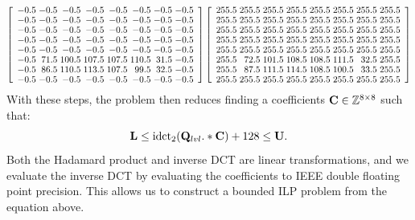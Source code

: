 {\small
\begin{equation}
\left[
\begin{array}{r@{\hspace{3pt}}r@{\hspace{3pt}}r@{\hspace{3pt}}r@{\hspace{3pt}}r@{\hspace{3pt}}r@{\hspace{3pt}}r@{\hspace{3pt}}r}
-0.5 & -0.5 & -0.5 & -0.5 & -0.5 & -0.5 & -0.5 & -0.5\\[-1pt]
-0.5 & -0.5 & -0.5 & -0.5 & -0.5 & -0.5 & -0.5 & -0.5\\[-1pt]
-0.5 & -0.5 & -0.5 & -0.5 & -0.5 & -0.5 & -0.5 & -0.5\\[-1pt]
-0.5 & -0.5 & -0.5 & -0.5 & -0.5 & -0.5 & -0.5 & -0.5\\[-1pt]
-0.5 & -0.5 & -0.5 & -0.5 & -0.5 & -0.5 & -0.5 & -0.5\\[-1pt]
-0.5 & 71.5 & 100.5 & 107.5 & 107.5 & 110.5 & 31.5 & -0.5\\[-1pt]
-0.5 & 86.5 & 110.5 & 113.5 & 107.5 &  99.5 & 32.5 & -0.5\\[-1pt]
-0.5 & -0.5 & -0.5 & -0.5 & -0.5 & -0.5 & -0.5 & -0.5\\[-1pt]
\end{array}
\right]
\left[
\begin{array}{r@{\hspace{3pt}}r@{\hspace{3pt}}r@{\hspace{3pt}}r@{\hspace{3pt}}r@{\hspace{3pt}}r@{\hspace{3pt}}r@{\hspace{3pt}}r}
255.5 & 255.5 & 255.5 & 255.5 & 255.5 & 255.5 & 255.5 & 255.5\\[-1pt]
255.5 & 255.5 & 255.5 & 255.5 & 255.5 & 255.5 & 255.5 & 255.5\\[-1pt]
255.5 & 255.5 & 255.5 & 255.5 & 255.5 & 255.5 & 255.5 & 255.5\\[-1pt]
255.5 & 255.5 & 255.5 & 255.5 & 255.5 & 255.5 & 255.5 & 255.5\\[-1pt]
255.5 & 255.5 & 255.5 & 255.5 & 255.5 & 255.5 & 255.5 & 255.5\\[-1pt]
255.5 & 72.5 & 101.5 & 108.5 & 108.5 & 111.5 & 32.5 & 255.5\\[-1pt]
255.5 & 87.5 & 111.5 & 114.5 & 108.5 & 100.5 & 33.5 & 255.5\\[-1pt]
255.5 & 255.5 & 255.5 & 255.5 & 255.5 & 255.5 & 255.5 & 255.5\\[-1pt]
\end{array}
\right]
\end{equation}
}
%
With these steps, the problem then reduces finding a coefficients
\(\mathbf{C} \in \mathbb{Z}^{8\times8}\) such that:
%
\[\mathbf{L} \leq \mathrm{idct}_2(\mathbf{Q}_{lvl} .* \mathbf{C}) + 128 \leq \mathbf{U}.\]
%
Both the Hadamard product and inverse DCT are linear transformations,
and we evaluate the inverse DCT by evaluating the coefficients
to IEEE double floating point precision.  This allows us to construct
a bounded ILP problem from the equation above.

